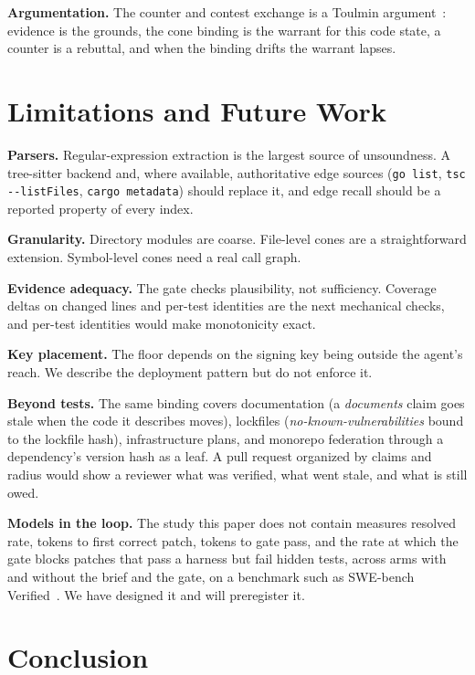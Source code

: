 \documentclass[conference]{IEEEtran}
\begin{document}
\textbf{Argumentation.} The counter and contest exchange is a Toulmin argument~\citep{toulmin1958}: evidence is the grounds, the cone binding is the warrant for this code state, a counter is a rebuttal, and when the binding drifts the warrant lapses.

\section{Limitations and Future Work}

\textbf{Parsers.} Regular-expression extraction is the largest source of unsoundness. A tree-sitter backend and, where available, authoritative edge sources (\texttt{go list}, \texttt{tsc -{}-listFiles}, \texttt{cargo metadata}) should replace it, and edge recall should be a reported property of every index.

\textbf{Granularity.} Directory modules are coarse. File-level cones are a straightforward extension. Symbol-level cones need a real call graph.

\textbf{Evidence adequacy.} The gate checks plausibility, not sufficiency. Coverage deltas on changed lines and per-test identities are the next mechanical checks, and per-test identities would make monotonicity exact.

\textbf{Key placement.} The floor depends on the signing key being outside the agent's reach. We describe the deployment pattern but do not enforce it.

\textbf{Beyond tests.} The same binding covers documentation (a \emph{documents} claim goes stale when the code it describes moves), lockfiles (\emph{no-known-vulnerabilities} bound to the lockfile hash), infrastructure plans, and monorepo federation through a dependency's version hash as a leaf. A pull request organized by claims and radius would show a reviewer what was verified, what went stale, and what is still owed.

\textbf{Models in the loop.} The study this paper does not contain measures resolved rate, tokens to first correct patch, tokens to gate pass, and the rate at which the gate blocks patches that pass a harness but fail hidden tests, across arms with and without the brief and the gate, on a benchmark such as SWE-bench Verified~\citep{jimenez2024swebench}. We have designed it and will preregister it.

\section{Conclusion}
\end{document}
